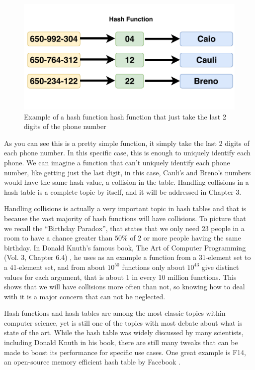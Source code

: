 \bigskip

\begin{figure}[h!]
  \centering
  \includegraphics[width=12cm]{figuras/phone-hash-example.pdf}
  \caption{Example of a hash function hash function that just take the last 2 digits of the phone number }
\end{figure}

\medskip

As you can see this is a pretty simple function, it simply take the last 2 digits of each phone number. In this specific case, this is enough to uniquely identify each phone. We can imagine a function that can't uniquely identify each phone number, like getting just the last digit, in this case, Cauli's and Breno's numbers would have the same hash value, a collision in the table. Handling collisions in a hash table is a complete topic by itself, and it will be addressed in Chapter 3. 

Handling collisions is actually a very important topic in hash tables and that is because the vast majority of hash functions will have collisions. To picture that we recall the ``Birthday Paradox'', that states that we only need 23 people in a room to have a chance greater than \( 50\% \) of 2 or more people having the same birthday. In Donald Knuth's famous book, The Art of Computer Programming (Vol. 3, Chapter 6.4) \citep{TAOCP3}, he uses as an example a function from a 31-element set to a 41-element set, and from about \( 10^{50} \) functions only about \( 10^{43} \) give distinct values for each argument, that is about 1 in every 10 million functions. This shows that we will have collisions more often than not, so knowing how to deal with it is a major concern that can not be neglected.

Hash functions and hash tables are among the most classic topics within computer science, yet is still one of the topics with most debate about what is state of the art. While the hash table was widely discussed by many scientists, including Donald Knuth in his book, there are still many tweaks that can be made to boost its performance for specific use cases. One great example is F14, an open-source memory efficient hash table by Facebook \citep{F14}.

